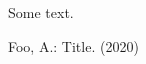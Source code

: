\documentclass{sn-jnl}
\begin{document}
Some text.
\begin{thebibliography}{}
 Foo, A.: Title. (2020)
\end{thebibliography}
\citep{a}
\end{document}
